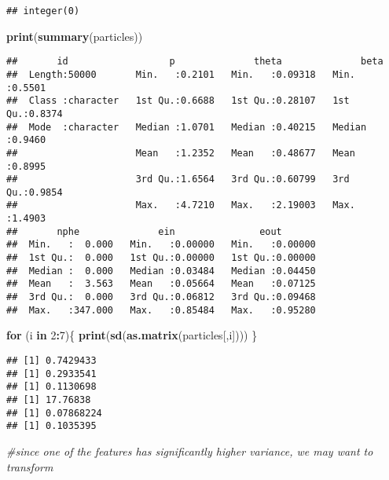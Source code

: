 \documentclass[
]{article}
\newenvironment{Shaded}{\begin{snugshade}}{\end{snugshade}}
\newcommand{\CommentTok}[1]{\textcolor[rgb]{0.56,0.35,0.01}{\textit{#1}}}
\newcommand{\ControlFlowTok}[1]{\textcolor[rgb]{0.13,0.29,0.53}{\textbf{#1}}}
\newcommand{\DecValTok}[1]{\textcolor[rgb]{0.00,0.00,0.81}{#1}}
\newcommand{\KeywordTok}[1]{\textcolor[rgb]{0.13,0.29,0.53}{\textbf{#1}}}
\newcommand{\NormalTok}[1]{#1}
\newcommand{\OperatorTok}[1]{\textcolor[rgb]{0.81,0.36,0.00}{\textbf{#1}}}
\begin{document}
\begin{verbatim}
## integer(0)
\end{verbatim}

\begin{Shaded}
\begin{Highlighting}[]
\KeywordTok{print}\NormalTok{(}\KeywordTok{summary}\NormalTok{(particles))}
\end{Highlighting}
\end{Shaded}

\begin{verbatim}
##       id                  p              theta              beta       
##  Length:50000       Min.   :0.2101   Min.   :0.09318   Min.   :0.5501  
##  Class :character   1st Qu.:0.6688   1st Qu.:0.28107   1st Qu.:0.8374  
##  Mode  :character   Median :1.0701   Median :0.40215   Median :0.9460  
##                     Mean   :1.2352   Mean   :0.48677   Mean   :0.8995  
##                     3rd Qu.:1.6564   3rd Qu.:0.60799   3rd Qu.:0.9854  
##                     Max.   :4.7210   Max.   :2.19003   Max.   :1.4903  
##       nphe              ein               eout        
##  Min.   :  0.000   Min.   :0.00000   Min.   :0.00000  
##  1st Qu.:  0.000   1st Qu.:0.00000   1st Qu.:0.00000  
##  Median :  0.000   Median :0.03484   Median :0.04450  
##  Mean   :  3.563   Mean   :0.05664   Mean   :0.07125  
##  3rd Qu.:  0.000   3rd Qu.:0.06812   3rd Qu.:0.09468  
##  Max.   :347.000   Max.   :0.85484   Max.   :0.95280
\end{verbatim}

\begin{Shaded}
\begin{Highlighting}[]
\ControlFlowTok{for}\NormalTok{ (i }\ControlFlowTok{in} \DecValTok{2}\OperatorTok{:}\DecValTok{7}\NormalTok{)\{}
  \KeywordTok{print}\NormalTok{(}\KeywordTok{sd}\NormalTok{(}\KeywordTok{as.matrix}\NormalTok{(particles[,i])))}
\NormalTok{\}}
\end{Highlighting}
\end{Shaded}

\begin{verbatim}
## [1] 0.7429433
## [1] 0.2933541
## [1] 0.1130698
## [1] 17.76838
## [1] 0.07868224
## [1] 0.1035395
\end{verbatim}

\begin{Shaded}
\begin{Highlighting}[]
\CommentTok{#since one of the features has significantly higher variance, we may want to transform}
\end{Highlighting}
\end{Shaded}
\end{document}

